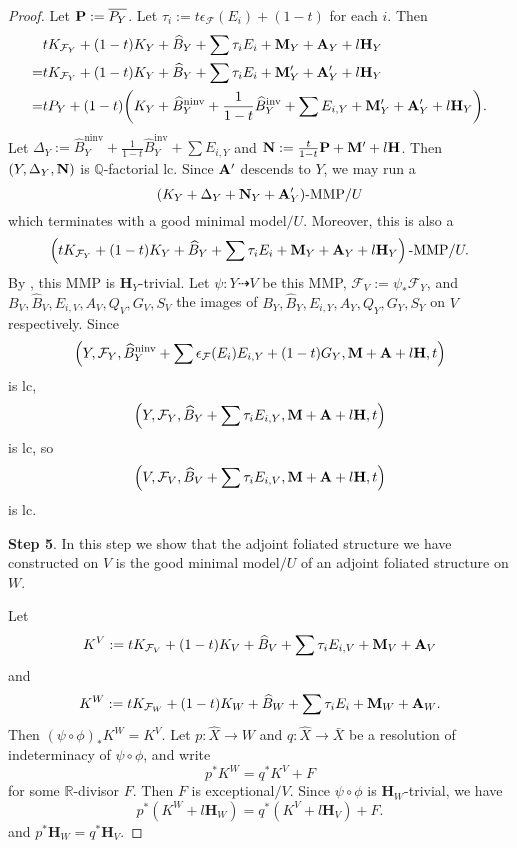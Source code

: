 \documentclass[12pt]{amsart}
\numberwithin{equation}{section}
\newcommand{\Mm}{{\bf{M}}}
\newcommand{\Nn}{{\bf{N}}}
\newcommand{\Pp}{{\bf{P}}}
\newcommand{\Qq}{\mathbb{Q}}
\newcommand{\Rr}{\mathbb{R}}
\newcommand{\Hh}{\mathbf{H}}
\newcommand{\ninv}{\operatorname{ninv}}
\newcommand{\inv}{\operatorname{inv}}
\newcommand{\Aa}{{\bf{A}}}
\newcommand{\Ff}{\mathcal{F}}
\theoremstyle{definition}
\theoremstyle{definition}
\theoremstyle{definition}
\begin{document}
\begin{proof}
Let $\Pp:=\overline{P_Y}$. Let $\tau_i:=t\epsilon_{\Ff}(E_i)+(1-t)$ for each $i$. Then
\begin{align*}
    &tK_{\Ff_Y}+(1-t)K_Y+\widehat{B}_Y+\sum \tau_iE_i+\Mm_Y+\Aa_Y+l\Hh_Y\\
        =&tK_{\Ff_Y}+(1-t)K_Y+\widehat{B}_Y+\sum \tau_iE_i+\Mm'_Y+\Aa'_Y+l\Hh_Y\\
=&tP_Y+(1-t)\bigg(K_Y+\widehat{B}_Y^{\ninv}+\frac{1}{1-t}\widehat{B}_Y^{\inv}+\sum E_{i,Y}+\Mm'_Y+\Aa'_Y+l\Hh_Y\bigg).
\end{align*}
Let $\Delta_Y:=\widehat{B}_Y^{\ninv}+\frac{1}{1-t}\widehat{B}_Y^{\inv}+\sum E_{i,Y}$ and $\Nn:=\frac{t}{1-t}\Pp+\Mm'+l\Hh$. Then $(Y,\Delta_Y,\Nn)$ is $\Qq$-factorial lc. Since $\Aa'$ descends to $Y$, we may run a 
$$(K_Y+\Delta_Y+\Nn_Y+\Aa'_Y)\text{-MMP}/U$$
which terminates with a good minimal model$/U$. Moreover, this is also a 
$$\left(tK_{\Ff_Y}+(1-t)K_Y+\widehat{B}_Y+\sum \tau_iE_i+\Mm_Y+\Aa_Y+l\Hh_Y\right)\text{-MMP}/U.$$
By \cite[Lemma B.6]{LMX24b}, this MMP is $\Hh_Y$-trivial. Let $\psi: Y\dashrightarrow V$ be this MMP, $\Ff_V:=\psi_\ast \Ff_Y$, and $B_V,\widehat{B}_V,E_{i,V},A_V,Q_V,G_V,S_V$ the images of $B_Y,\widehat{B}_Y,E_{i,Y},A_Y,Q_Y,G_Y,S_Y$ on $V$ respectively. Since
$$\left(Y,\Ff_Y,\widehat{B}_Y^{\ninv}+\sum\epsilon_{\Ff}(E_i)E_{i,Y}+(1-t)G_Y,\Mm+\Aa+l\Hh,t\right)$$
is lc,
$$\left(Y,\Ff_Y,\widehat{B}_Y+\sum\tau_iE_{i,Y},\Mm+\Aa+l\Hh,t\right)$$
is lc, so
$$\left(V,\Ff_V,\widehat{B}_V+\sum\tau_iE_{i,V},\Mm+\Aa+l\Hh,t\right)$$
is lc.

\medskip

\noindent\textbf{Step 5}. In this step we show that the adjoint foliated structure we have constructed on $V$ is the good minimal model$/U$ of an adjoint foliated structure on $W$.

Let 
$$K^V:=tK_{\Ff_V}+(1-t)K_V+\widehat{B}_V+\sum\tau_iE_{i,V}+\Mm_V+\Aa_V$$
and
$$K^W:=tK_{\Ff_W}+(1-t)K_W+\widehat{B}_W+\sum\tau_iE_{i}+\Mm_W+\Aa_W.$$
Then $(\psi\circ\phi)_\ast K^W=K^V$. Let $p: \widehat X\rightarrow W$ and $q: \widehat X\rightarrow\bar X$ be a resolution of indeterminacy of $\psi\circ\phi$, and write
$$p^\ast K^W=q^\ast K^V+F$$
for some $\Rr$-divisor $F$. Then $F$ is exceptional$/V$. Since $\psi\circ\phi$ is $\Hh_W$-trivial, we have
$$p^\ast (K^W+l\Hh_W)=q^\ast (K^V+l\Hh_V)+F.$$
and $p^\ast \Hh_W=q^\ast \Hh_{V}$. 


\end{proof}
\end{document}
